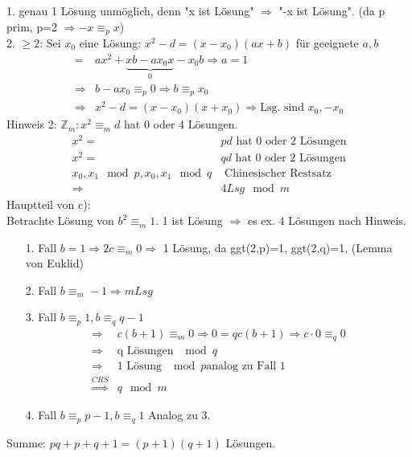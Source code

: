 \documentclass[mitschriften.tex]{subfiles}
\begin{document}
\subsubsection{}
1. genau 1 Lösung unmöglich, denn "x ist Lösung" $\Rightarrow$ "-x ist Lösung". (da p prim, p=2 $\Rightarrow -x \equiv_p x$)\\
2.  $\geq 2$: Sei $x_0$ eine Lösung: $x^2-d = (x-x_0)(ax+b)$ für geeignete $a,b$\\
\begin{align*}
= & ax^2+\underbrace{xb-ax_0x}_0 - x_0b \Rightarrow a = 1\\
\Rightarrow & b-ax_0 \equiv_p 0 \Rightarrow b \equiv_p x_0\\
\Rightarrow & x^2-d = (x-x_0)(x+x_0) \Rightarrow \text{Lsg. sind } x_0, -x_0
\end{align*}
Hinweis 2: $\mathbb{Z}_m: x^2 \equiv_m d$ hat 0 oder 4 Lösungen.\\
\begin{align*}
x^2 = & pd \text{ hat 0 oder 2 Lösungen}\\
x^2 = & qd \text{ hat 0 oder 2 Lösungen}\\
x_0,x_1 \mod p, x_0,x_1 \mod q& \text{ Chinesischer Restsatz}\\
\Rightarrow & 4 Lsg \mod m
\end{align*}
Hauptteil von c):\\
Betrachte Lösung von $b^2 \equiv_m 1$. 1 ist Lösung $\Rightarrow$ es ex. 4 Lösungen nach Hinweis.\\
\begin{itemize}
	\item[1. Fall] $b = 1\Rightarrow 2c \equiv_m 0 \Rightarrow$ 1 Lösung, da ggt(2,p)=1, ggt(2,q)=1, (Lemma von Euklid)
	\item[2. Fall] $b\equiv_m -1\Rightarrow m Lsg$
	\item[3. Fall] $b\equiv_p 1, b \equiv_q q-1$ 
	\begin{align*}
	\Rightarrow &c(b+1) \equiv_m 0 \Rightarrow 0 = qc(b+1)\Rightarrow c\cdot 0 \equiv_q 0\\
	\Rightarrow & \text{q Lösungen } \mod q\\
	\Rightarrow & \text{1 Lösung } \mod p \text{analog zu Fall 1}\\
	\overset{CRS}{\Rightarrow} & q \mod m
	\end{align*}
	\item[4. Fall] $b\equiv_p p-1, b \equiv_q 1$ \qquad Analog zu 3.
\end{itemize}
Summe: $pq+p+q+1 = (p+1)(q+1)$ Lösungen.
\end{document}
